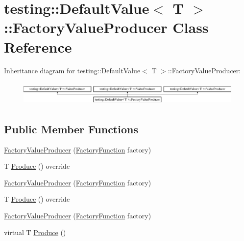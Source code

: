 \hypertarget{classtesting_1_1_default_value_1_1_factory_value_producer}{}\section{testing\+::Default\+Value$<$ T $>$\+::Factory\+Value\+Producer Class Reference}
\label{classtesting_1_1_default_value_1_1_factory_value_producer}
Inheritance diagram for testing\+::Default\+Value$<$ T $>$\+::Factory\+Value\+Producer\+:\begin{figure}[H]
\begin{center}
\leavevmode
\includegraphics[height=1.236203cm]{d4/dab/classtesting_1_1_default_value_1_1_factory_value_producer}
\end{center}
\end{figure}
\subsection*{Public Member Functions}
\begin{DoxyCompactItemize}
\item 
\mbox{\hyperlink{classtesting_1_1_default_value_1_1_factory_value_producer_adc9253b20288be937687b3cefa7ef476}{Factory\+Value\+Producer}} (\mbox{\hyperlink{classtesting_1_1_default_value_a5763a68d75e0a4c97fcaff708e2df803}{Factory\+Function}} factory)
\item 
T \mbox{\hyperlink{classtesting_1_1_default_value_1_1_factory_value_producer_ad669217ac582007bc2e1b08dc13deba5}{Produce}} () override
\item 
\mbox{\hyperlink{classtesting_1_1_default_value_1_1_factory_value_producer_adc9253b20288be937687b3cefa7ef476}{Factory\+Value\+Producer}} (\mbox{\hyperlink{classtesting_1_1_default_value_a5763a68d75e0a4c97fcaff708e2df803}{Factory\+Function}} factory)
\item 
T \mbox{\hyperlink{classtesting_1_1_default_value_1_1_factory_value_producer_ad669217ac582007bc2e1b08dc13deba5}{Produce}} () override
\item 
\mbox{\hyperlink{classtesting_1_1_default_value_1_1_factory_value_producer_adc9253b20288be937687b3cefa7ef476}{Factory\+Value\+Producer}} (\mbox{\hyperlink{classtesting_1_1_default_value_a5763a68d75e0a4c97fcaff708e2df803}{Factory\+Function}} factory)
\item 
virtual T \mbox{\hyperlink{classtesting_1_1_default_value_1_1_factory_value_producer_a246a02412c099b293d905a9749c0fab3}{Produce}} ()
\end{DoxyCompactItemize}
